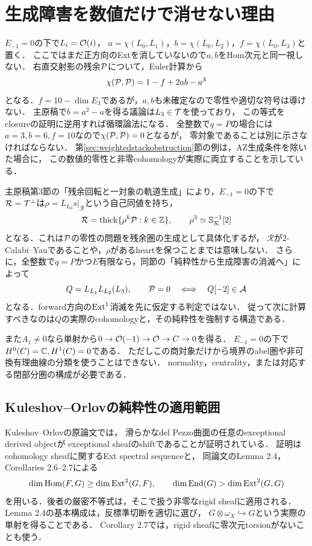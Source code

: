 \documentclass[11pt,a4paper]{ltjsarticle}
\begin{document}
\section{生成障害を数値だけで消せない理由}
$E_{-1}=0$の下で$L_i=\mathcal O(i)$，
$a=\chi(L_0,L_1)$，$b=\chi(L_0,L_2)$，$f=\chi(L_0,L_3)$と置く．
ここではまだ正方向のExtを消していないので$a,b$をHom次元と同一視しない．
右直交射影の残余$\mathcal P$について，Euler計算から
\[
 \chi(\mathcal P,\mathcal P)=1-f+2ab-a^3
\]
となる．$f=10-\dim E_3$であるが，$a,b$も未確定なので零性や適切な符号は導けない．
主原稿で$b=a^2-a$を得る議論は$L_3\in\mathcal T$を使っており，
この等式をclosureの証明に逆用すれば循環論法になる．
全整数で$q=P$の場合には$a=3,b=6,f=10$なので$\chi(\mathcal P,\mathcal P)=0$となるが，
零対象であることは別に示さなければならない．
第\ref{sec:weightedstackobstruction}節の例は，AZ生成条件を除いた場合に，
この数値的零性と非零cohomologyが実際に両立することを示している．

主原稿第3節の「残余回転と一対象の軌道生成」により，$E_{-1}=0$の下で
$\mathcal R=\mathcal T^\perp$は$\rho=L_{L_0}s|_{\mathcal R}$という自己同値を持ち，
\[
 \mathcal R=\operatorname{thick}\{\rho^k\mathcal P:k\in\mathbb Z\},\qquad
 \rho^3\simeq\mathbb S_{\mathcal R}^{-1}[2]
\]
となる．これは$\mathcal P$の零性の問題を残余圏の生成として具体化するが，
$\mathcal R$が2-Calabi--Yauであることや，$\rho$があるheartを保つことまでは意味しない．
さらに，全整数で$q=P$かつ$E$有限なら，同節の「純粋性から生成障害の消滅へ」によって
\[
 Q=L_{L_1}L_{L_2}(L_3),\qquad
 \mathcal P=0\quad\Longleftrightarrow\quad Q[-2]\in\mathcal A
\]
となる．forward方向の$\operatorname{Ext}^1$消滅を先に仮定する判定ではない．
従って次に計算すべきなのは$Q$の実際のcohomologyと，その純粋性を強制する構造である．

また$A_1\ne0$なら単射から$0\to\mathcal O(-1)\to\mathcal O\to C\to0$を得る．
$E_{-1}=0$の下で$H^0(C)=\mathbb C,H^1(C)=0$である．
ただしこの商対象だけから境界のabel圏や非可換有理曲線の分類を使うことはできない．
normality，centrality，または対応する閉部分圏の構成が必要である．

\subsection{Kuleshov--Orlovの純粋性の適用範囲}

Kuleshov--Orlovの原論文\cite[Proposition 2.10, p.~487]{KO}では，
滑らかなdel Pezzo曲面の任意のexceptional derived objectが
exceptional sheafのshiftであることが証明されている．
証明はcohomology sheafに関するExt spectral sequenceと，
同論文のLemma 2.4，Corollaries 2.6--2.7による
\[
 \dim\operatorname{Hom}(F,G)\geq\dim\operatorname{Ext}^2(G,F),\qquad
 \dim\operatorname{End}(G)>\dim\operatorname{Ext}^2(G,G)
\]
を用いる．後者の厳密不等式は，そこで扱う非零なrigid sheafに適用される．
Lemma 2.4の基本構成は，反標準切断を適切に選び，
$G\otimes\omega_X\hookrightarrow G$という実際の単射を得ることである．
Corollary 2.7では，rigid sheafに零次元torsionがないことも使う．
\end{document}
